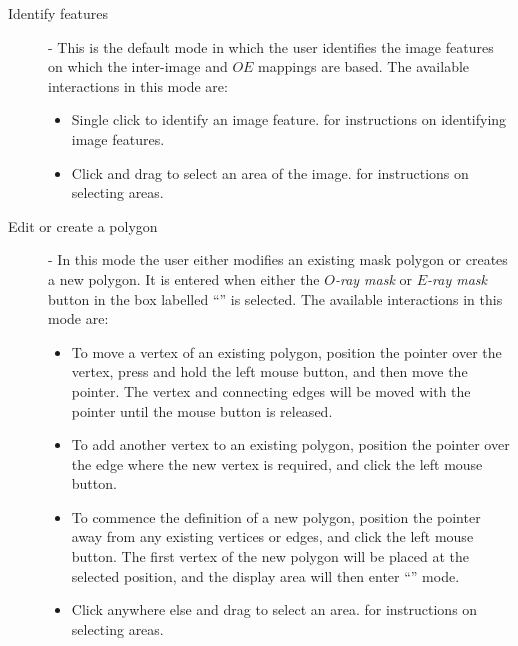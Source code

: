 \documentclass[11pt,nolof]{starlink}
\providecommand{\mylabel}[1] {\xlabel{#1}\label{#1}}
\begin{document}
\begin{description}

\item [\mylabel{POLKA_MODE_0} Identify features] - This is the default
mode in which the user identifies the image features on which the
inter-image and $OE$ mappings are based. The available interactions in
this mode are:

\begin{itemize}

\item Single click to identify an image feature.  for instructions on identifying
image features.

\item Click and drag to select an area of the image.  for instructions on selecting areas.

\end{itemize}

\item [\mylabel{POLKA_MODE_1} Edit or create a polygon] - In this mode
the user either modifies an existing mask polygon or creates a new
polygon. It is entered when either the \emph{$O$-ray mask} or \emph{$E$-ray
mask} button in the box labelled ``'' is selected. The available interactions in
this mode are:

\begin{itemize}

\item To move a vertex of an existing polygon, position the pointer over
the vertex, press and hold the left mouse button, and then move the
pointer. The vertex and connecting edges will be moved with the pointer
until the mouse button is released.

\item To add another vertex to an existing polygon, position the pointer
over the edge where the new vertex is required, and click the left mouse
button.

\item To commence the definition of a new polygon, position the pointer
away from any existing vertices or edges, and click the left mouse button.
The first vertex of the new polygon will be placed at the selected
position, and the display area will then enter ``'' mode.

\item Click anywhere else and drag to select an area.  for instructions on selecting areas.


\end{itemize}
\end{description}
\end{document}
